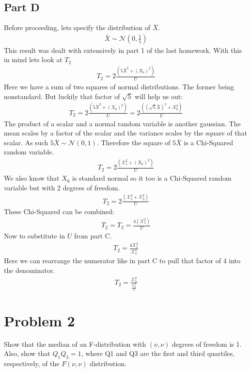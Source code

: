 \documentclass{article}
\begin{document}
\subsection*{Part D}
Before proceeding, lets specify the distribution of $\bar{X}$.
\begin{align*}
\bar{X} \sim \mathcal{N}(0,\frac{1}{5})
\end{align*}
This result was dealt with extensively in part 1 of the last homework. With this in mind lets look at $T_2$
\begin{align*}
T_2 = 2\frac{(5\bar{X}^2+(X_6)^2)}{U}
\end{align*}
Here we have a sum of two squares of normal distributions. The former being nonstandard. But luckily that factor of $\sqrt{5}$ will help us out:
\begin{align*}
T_2 = 2\frac{(5\bar{X}^2+(X_6)^2)}{U} = 2\frac{((\sqrt{5}\bar{X})^2+X_6^2)}{U}
\end{align*}
The product of a scalar and a normal random variable is another gaussian. The mean scales by a factor of the scalar and the variance scales by the square of that scalar. As such $5\bar{X} \sim \mathcal{N}(0,1)$. Therefore the square of $5\bar{X}$ is a Chi-Squared random variable.
\begin{align*}
T_2 = 2\frac{(\mathcal{X}^2_5+(X_6)^2)}{U}
\end{align*}
We also know that $X_6$ is standard normal so it too is a Chi-Squared random variable but with 2 degrees of freedom.
\begin{align*}
T_2 = 2\frac{(\mathcal{X}^2_5+\mathcal{X}^2_2)}{U}
\end{align*}
These Chi-Squared can be combined:
\begin{align*}
T_2 = T_2 = \frac{4(\mathcal{X}^2_5)}{U}
\end{align*}
Now to substitute in $U$ from part C.
\begin{align*}
T_2 = \frac{4\mathcal{X}^2_5}{\mathcal{X}^2_4}
\end{align*}
Here we can rearrange the numerator like in part C to pull that factor of 4 into the denominator.
\begin{align*}
\boxed { T_2 = \frac{\mathcal{X}^2_5}{\tfrac{\mathcal{X}^2_4}{4}} }
\end{align*}

\clearpage

\section*{Problem 2}
Show that the median of an F-distribution with $(\nu, \nu)$ degrees of freedom is 1. Also,
show that $Q_1Q_3 = 1$, where Q1 and Q3 are the first and third quartiles, respectively, of the $F(\nu,\nu)$
distribution.
\end{document}
